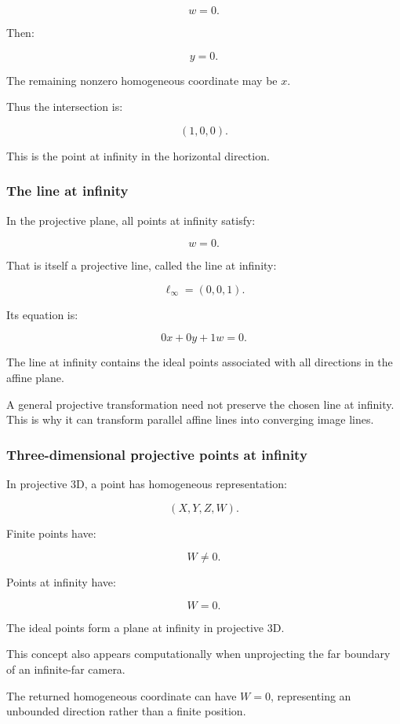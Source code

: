 \[
 w=0.
\]

Then:

\[
 y=0.
\]

The remaining nonzero homogeneous coordinate may be \(x\).

Thus the intersection is:

\[
 \boxed{ (1,0,0) }.
\]

This is the point at infinity in the horizontal direction.

\subsubsection{The line at infinity}\label{02-foundations-ii-ch032-the-line-at-infinity}

In the projective plane, all points at infinity satisfy:

\[
 w=0.
\]

That is itself a projective line, called the line at infinity:

\[
 \boxed{ \ell_\infty=(0,0,1) }.
\]

Its equation is:

\[
 0x+0y+1w=0.
\]

The line at infinity contains the ideal points associated with all directions in the affine plane.

A general projective transformation need not preserve the chosen line at infinity. This is why it can transform parallel affine lines into converging image lines.

\subsubsection{Three-dimensional projective points at infinity}\label{02-foundations-ii-ch032-three-dimensional-projective-points-at-infinity}

In projective 3D, a point has homogeneous representation:

\[
 \boxed{ (X,Y,Z,W) }.
\]

Finite points have:

\[
 W\ne0.
\]

Points at infinity have:

\[
 \boxed{W=0}.
\]

The ideal points form a plane at infinity in projective 3D.

This concept also appears computationally when unprojecting the far boundary of an infinite-far camera.

The returned homogeneous coordinate can have \(W=0\), representing an unbounded direction rather than a finite position.

